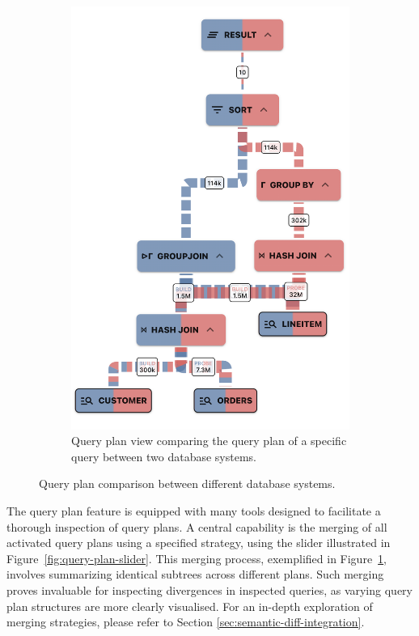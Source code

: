 \begin{figure}[h]
\begin{subfigure}[b]{0.35\linewidth}
      \includegraphics[width=\linewidth]{figures/query-plan-combined-slim.png}
      \caption{Query plan view comparing the query plan of a specific query between two database systems.}
      \label{fig:query-plan-combined}
  \end{subfigure}
  \caption{Query plan comparison between different database systems.}
  \label{fig:query-plan}
\end{figure}


The query plan feature is equipped with many tools designed to facilitate a thorough inspection of query plans.
A central capability is the merging of all activated query plans using a specified strategy, using the slider illustrated in Figure~\ref{fig:query-plan-slider}. This merging process, exemplified in Figure~\ref{fig:query-plan-combined}, involves summarizing identical subtrees across different plans. Such merging proves invaluable for inspecting divergences in inspected queries, as varying query plan structures are more clearly visualised. For an in-depth exploration of merging strategies, please refer to Section \ref{sec:semantic-diff-integration}.


